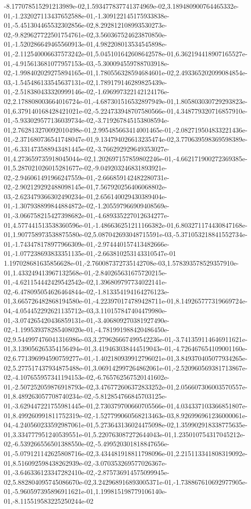 -8.177078515291213989e-02,1.593477837741374969e-02,3.189480900764465332e-01,-1.232027113437652588e-01,-1.309122145175933838e-01,-5.451304465532302856e-02,8.292812108993530273e-02,-9.829627722501754761e-02,3.560367524623870850e-01,-1.520286649465560913e-01,4.982208013534545898e-01,-2.112540006637573242e-01,5.045101642608642578e-01,6.362194418907165527e-01,-4.915613681077957153e-03,-5.300094559788703918e-02,-1.998402029275894165e-01,1.780556328594684601e-02,2.493365202099084854e-03,-1.545486133545637131e-02,1.789179146289825439e-01,-2.518380433320999146e-02,-1.696997322142124176e-02,2.178808003664016724e-01,-4.687301516532897949e-01,1.805803030729293823e-01,6.379140168428421021e-02,-5.224733948707580566e-01,4.348779320716857910e-01,-5.933029577136039734e-02,-3.719267845153808594e-01,2.762813270092010498e-01,2.995485663414001465e-01,-2.082719504833221436e-01,-2.371680736541748047e-01,9.134794026613235474e-02,3.770639598369598389e-01,-6.331473588943481445e-02,-3.766292929649353027e-01,4.273659735918045044e-02,1.202697157859802246e-01,-4.662171900272369385e-01,5.287021026015281677e-02,-9.049203246831893921e-02,-2.946061491966247559e-01,-2.666859142482280731e-02,-2.902129292488098145e-01,7.567920256406068802e-03,-2.623479366302490234e-01,2.656140029430389404e-01,-1.307938899844884872e-02,-1.205597966909408569e-01,-3.066758215427398682e-01,-4.689335227012634277e-01,4.577441513538360596e-01,-1.486636251211166382e-01,6.803271174430847168e-01,1.907758973538875580e-02,5.087042693048715591e-03,-5.371053218841552734e-01,-1.743478178977966309e-01,-2.974440157413482666e-01,-1.077238693833351135e-01,-2.663810253143310547e-01
1.197028681635856628e-01,-2.760087372735142708e-03,1.578393578529357910e-01,1.433249413967132568e-01,-2.840265631675720215e-01,-4.621154442429542542e-02,1.396809797734022141e-02,-6.478095054626464844e-02,-1.813354194164276123e-01,3.665726482868194580e-01,-4.223970174789428711e-01,8.149265777319669724e-04,-4.054452292621135712e-03,3.110157847404479980e-01,-3.074265420436859131e-01,-3.406809270381927490e-02,-1.199539378285408020e-01,-4.781991988420486450e-02,9.544997476041316986e-03,3.279626667499542236e-01,-3.741359114646911621e-01,3.139056265354156494e-01,3.419463038444519043e-01,-4.726467654109001160e-02,6.771396994590759277e-01,-1.402180939912796021e-01,3.849370405077934265e-02,5.277517437934875488e-01,3.069142997264862061e-01,-2.520960569381713867e-02,-4.107655957341194153e-02,-6.765762567520141602e-01,-2.507252059876918793e-02,3.476772606372833252e-01,2.056607306003570557e-01,8.489263057708740234e-02,-5.812854766845703125e-01,-3.629447221755981445e-01,2.730379700660705566e-01,4.034337103366851807e-01,8.499260991811752319e-02,-1.527799060568213463e-03,8.926996961236000061e-04,-4.240560233592987061e-01,5.273643136024475098e-02,1.359902918338775635e-01,3.334777951240539551e-01,5.220763087272644043e-01,1.235010754317045212e-02,-6.539266556501388550e-02,-5.499520301818847656e-01,-5.079121142625808716e-02,3.434481918811798096e-01,2.215113341808319092e-01,8.516092598438262939e-02,-3.070353269577026367e-01,-3.646336123347282410e-02,-2.875736914575099945e-02,5.882804095745086670e-02,3.242968916893005371e-01,-1.738867610692977905e-01,-5.960597395896911621e-01,1.199815198779106140e-01,-8.115519583225250244e-02
